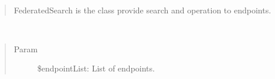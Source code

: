 \documentclass[letterpaper,10pt,english]{sphinxmanual}
\begin{document}

\begin{fulllineitems}
\label{docs/api:FederatedSearch}~\begin{quote}

FederatedSearch is the class provide search and operation to endpoints.
\end{quote}

\begin{fulllineitems}
\label{docs/api:FederatedSearch::addEndpoints}~\begin{quote}\begin{description}
\item[{Param}] \leavevmode
\$endpointList: List of endpoints.

\end{description}\end{quote}

\end{fulllineitems}


\end{fulllineitems}

\end{document}
